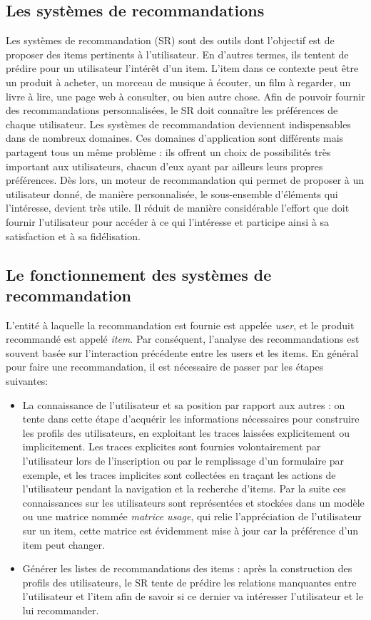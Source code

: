 \documentclass[a4paper,12pt,letterpaper,headsepline,singlespacing,headsepline, french]{report}
\begin{document}
\subsection{Les systèmes de recommandations}
Les systèmes de recommandation (SR) sont des outils dont l’objectif est de proposer des items pertinents à l’utilisateur. En d’autres termes, ils tentent de prédire pour un utilisateur l’intérêt d’un item. L’item dans ce contexte peut être un produit à acheter, un morceau de musique à écouter, un film à regarder, un livre à lire, une page web à consulter, ou bien autre chose. 
Afin de pouvoir fournir des recommandations personnalisées, le SR doit connaître les préférences de chaque utilisateur\cite{ref1}. Les systèmes de recommandation deviennent indispensables dans de nombreux domaines. Ces domaines d’application sont différents mais partagent tous un même problème : ils offrent un choix de possibilités très important aux utilisateurs, chacun d’eux ayant par ailleurs leurs propres préférences.
Dès lors, un moteur de recommandation qui permet de proposer à un utilisateur donné, de manière personnalisée, le sous-ensemble d’éléments qui l’intéresse, devient très utile. Il réduit de manière considérable l’effort que doit fournir l’utilisateur pour accéder à ce qui l’intéresse et participe ainsi à sa satisfaction et à sa fidélisation\cite{ref2}.
\subsection{Le fonctionnement des systèmes de recommandation}
L'entité à laquelle la recommandation est fournie est appelée \textit{user}, et le produit recommandé est appelé \textit{item}. Par conséquent, l'analyse des recommandations est souvent basée sur l'interaction précédente entre les users et les items\cite{ref3}.
En général pour faire une recommandation, il est nécessaire de passer par les étapes suivantes:
\begin{itemize}
\item La connaissance de l’utilisateur et sa position par rapport aux autres :
on tente dans cette étape d’acquérir les informations nécessaires pour construire les profils des utilisateurs, en exploitant les traces laissées explicitement ou implicitement. 
Les traces explicites sont fournies volontairement par l’utilisateur lors de l’inscription ou par le remplissage d’un formulaire par exemple, et les traces implicites sont collectées en traçant les actions de l’utilisateur pendant la navigation et la recherche d’items. 
Par la suite ces connaissances sur les utilisateurs sont représentées et stockées dans un modèle ou une matrice nommée \textit{matrice usage}, qui relie l’appréciation de l’utilisateur sur un item, cette matrice est évidemment mise à jour car la préférence d’un item peut changer.
	
\item Générer les listes de recommandations des items :
après la construction des profils des utilisateurs, le SR tente de prédire les relations manquantes entre l’utilisateur et l’item afin de savoir si ce dernier va intéresser l’utilisateur et le lui recommander.
\end{itemize}
\end{document}
